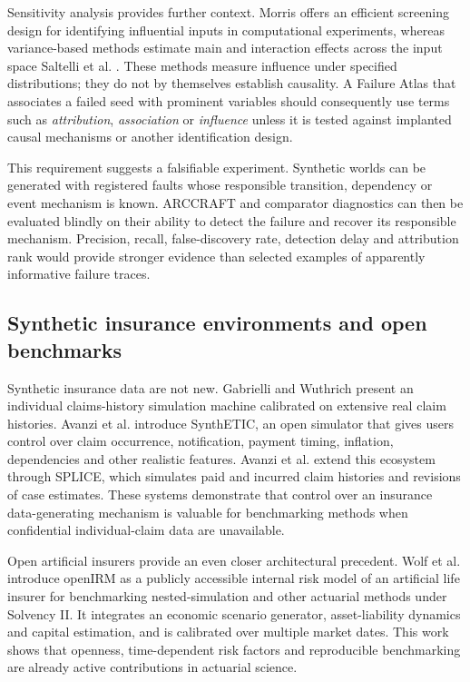 Sensitivity analysis provides further context. Morris \cite{Morris1991} offers an efficient screening design for identifying influential inputs in computational experiments, whereas variance-based methods estimate main and interaction effects across the input space Saltelli et al. \cite{Saltelli2008,Saltelli2010}. These methods measure influence under specified distributions; they do not by themselves establish causality. A Failure Atlas that associates a failed seed with prominent variables should consequently use terms such as \emph{attribution}, \emph{association} or \emph{influence} unless it is tested against implanted causal mechanisms or another identification design.

This requirement suggests a falsifiable experiment. Synthetic worlds can be generated with registered faults whose responsible transition, dependency or event mechanism is known. ARCCRAFT and comparator diagnostics can then be evaluated blindly on their ability to detect the failure and recover its responsible mechanism. Precision, recall, false-discovery rate, detection delay and attribution rank would provide stronger evidence than selected examples of apparently informative failure traces.

\subsection{Synthetic insurance environments and open benchmarks}\label{sec:synthetic-insurance-environments-and-open-benchmarks}

Synthetic insurance data are not new. Gabrielli and Wuthrich \cite{Gabrielli2018} present an individual claims-history simulation machine calibrated on extensive real claim histories. Avanzi et al. \cite{Avanzi2021} introduce SynthETIC, an open simulator that gives users control over claim occurrence, notification, payment timing, inflation, dependencies and other realistic features. Avanzi et al. \cite{Avanzi2023} extend this ecosystem through SPLICE, which simulates paid and incurred claim histories and revisions of case estimates. These systems demonstrate that control over an insurance data-generating mechanism is valuable for benchmarking methods when confidential individual-claim data are unavailable.

Open artificial insurers provide an even closer architectural precedent. Wolf et al. \cite{Wolf2026} introduce openIRM as a publicly accessible internal risk model of an artificial life insurer for benchmarking nested-simulation and other actuarial methods under Solvency II. It integrates an economic scenario generator, asset-liability dynamics and capital estimation, and is calibrated over multiple market dates. This work shows that openness, time-dependent risk factors and reproducible benchmarking are already active contributions in actuarial science.

